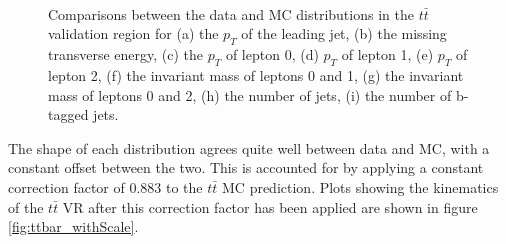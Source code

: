 \begin{figure}[H] 
    \centering
    \\
    \\
    \\
    \caption{Comparisons between the data and MC distributions in the $t\bar{t}$ validation region for (a) the $p_T$ of the leading jet, (b) the missing transverse energy, (c) the $p_T$ of lepton 0, (d) $p_T$ of lepton 1, (e) $p_T$ of lepton 2, (f) the invariant mass of leptons 0 and 1, (g) the invariant mass of leptons 0 and 2, (h) the number of jets, (i) the number of b-tagged jets.}
    \label{fig:ttbar_noScale}
\end{figure}

The shape of each distribution agrees quite well between data and MC, with a constant offset between the two. This is accounted for by applying a constant correction factor of 0.883 to the $t\bar{t}$ MC prediction. Plots showing the kinematics of the $t\bar{t}$ VR after this correction factor has been applied are shown in figure \ref{fig:ttbar_withScale}.

